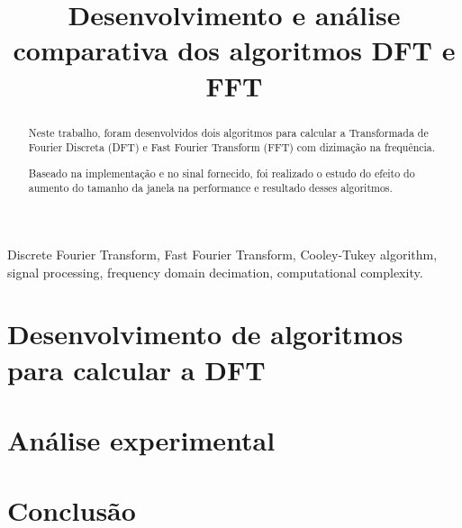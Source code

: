 \documentclass[conference]{IEEEtran}
\begin{document}
   \makeatletter
    \newcommand{\linebreakand}{%
      \end{@IEEEauthorhalign}
      \hfill\mbox{}\par
      \mbox{}\hfill\begin{@IEEEauthorhalign}
    }
    \makeatother

\title{Desenvolvimento e análise comparativa dos algoritmos DFT e FFT
}

\author{
\IEEEauthorblockN{}
\IEEEauthorblockA{}
}

\maketitle

\begin{abstract}
    Neste trabalho, foram desenvolvidos dois algoritmos para calcular a Transformada de Fourier Discreta (DFT) e Fast Fourier Transform (FFT) com dizimação na frequência. 

    Baseado na implementação e no sinal fornecido, foi realizado o estudo do efeito do aumento do tamanho da janela na performance e resultado desses algoritmos.
\end{abstract}

\begin{IEEEkeywords}
    Discrete Fourier Transform, Fast Fourier Transform, Cooley-Tukey algorithm, signal processing, frequency domain decimation, computational complexity.
\end{IEEEkeywords}

\section{Desenvolvimento de algoritmos para calcular a DFT}


\section{Análise experimental}


\section{Conclusão}


\end{document}
